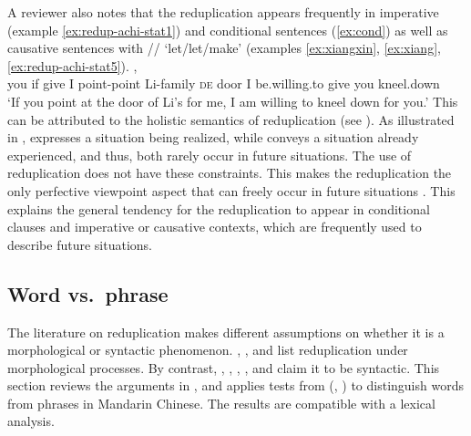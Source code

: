 A reviewer also notes that the reduplication appears frequently in imperative (example \ref{ex:redup-achi-stat1}) and conditional sentences (\ref{ex:cond}) as well as causative sentences with \slash{}\slash{} `let/let/make' (examples \ref{ex:xiangxin}, \ref{ex:xiang}, \ref{ex:redup-achi-stat5}).
\ea\label{ex:cond}
\gll {}       ,     \\
you if give I point-point Li-family \textsc{de} door I be.willing.to give you kneel.down\\
\glt `If you point at the door of Li's for me, I am willing to kneel down for you.'
\z
This can  be attributed to the holistic semantics of reduplication (see ).
As illustrated in ,  expresses a situation being realized,
while  conveys a situation already experienced,
and thus, both rarely occur in future situations.
The use of reduplication does not have these constraints.
This makes the reduplication the only perfective viewpoint aspect that can freely occur in future situations \citep[156--157]{XiaoMcEnery2004}.
This explains the general tendency for the reduplication to appear in conditional clauses and imperative or causative contexts,
which are frequently used to describe future situations.




\subsection{Word vs.\ phrase}\label{sec:word}

The literature on reduplication makes different assumptions on whether it is a morphological or syntactic phenomenon.
\citet[Ch. 4]{Chao1968}, \citet[Ch. 3]{LiThompson1981}, \citet[Sec. 4.1]{Dai1992} and \citet[4--5]{Liao2014} list reduplication under morphological processes. 
By contrast, \citet[23]{Arcodiaetal2014}, \citet{Xiong2016}, \citet[146]{BascianoMelloni2017}, \citet[229--231]{YangWei2017}, \citet[330]{MelloniBasciano2018} and \citet{Xie2020}  claim it to be syntactic.
This section reviews the arguments in \citet{Xie2020},
and applies tests from \citeauthor{Dai1992} (\citeyear[Sec. 7]{Dai1992}, \citeyear[Sec. 2.3--2.4]{Dai1998}) to distinguish words from phrases in Mandarin Chinese.
The results are compatible with a lexical analysis.



